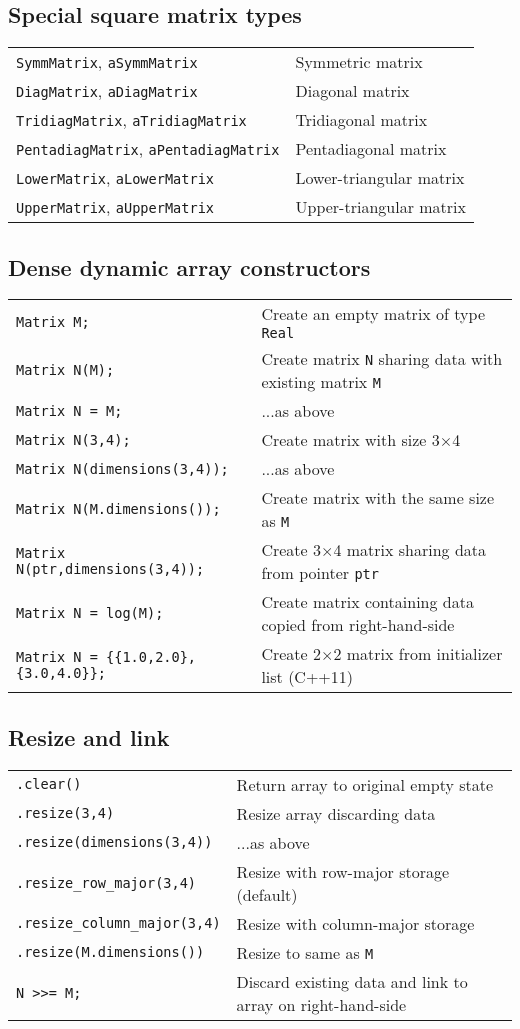\documentclass[10pt,a4,landscape]{article}
\def\code#1{\texttt{#1}}
\begin{document}
\subsection*{Special square matrix types}
\begin{tabular}{ll}
\code{SymmMatrix}, \code{aSymmMatrix} & Symmetric matrix\\
\code{DiagMatrix}, \code{aDiagMatrix} & Diagonal matrix\\
\code{TridiagMatrix}, \code{aTridiagMatrix} & Tridiagonal matrix\\
\code{PentadiagMatrix}, \code{aPentadiagMatrix} & Pentadiagonal matrix\\
\code{LowerMatrix}, \code{aLowerMatrix} & Lower-triangular matrix\\
\code{UpperMatrix}, \code{aUpperMatrix} & Upper-triangular matrix\\
\end{tabular}
\subsection*{Dense dynamic array constructors}
\begin{tabular}{ll}
\code{Matrix M;} & Create an empty matrix of type \code{Real}\\
\code{Matrix N(M);} & Create matrix \code{N} sharing data with existing matrix \code{M}\\
\code{Matrix N = M;} & ...as above\\
\code{Matrix N(3,4);} & Create matrix with size 3$\times$4\\
\code{Matrix N(dimensions(3,4));} & ...as above\\
\code{Matrix N(M.dimensions());} & Create matrix with the same size as \code{M}\\
\code{Matrix N(ptr,dimensions(3,4));} & Create 3$\times$4 matrix sharing data from pointer \code{ptr}\\
\code{Matrix N = log(M);} & Create matrix containing data copied from right-hand-side\\
\code{Matrix N = \{\{1.0,2.0\},\{3.0,4.0\}\};} & Create 2$\times$2 matrix from initializer list (C++11)\\
\end{tabular}
\subsection*{Resize and link}
\begin{tabular}{ll}
\code{.clear()} & Return array to original empty state\\
\code{.resize(3,4)} & Resize array discarding data\\
\code{.resize(dimensions(3,4))} & ...as above\\
\code{.resize\_row\_major(3,4)} & Resize with row-major storage (default)\\
\code{.resize\_column\_major(3,4)} & Resize with column-major storage\\
\code{.resize(M.dimensions())} & Resize to same as \code{M}\\
\code{N >{}>= M;} & Discard existing data and link to array on right-hand-side\\
\end{tabular}
\end{document}
